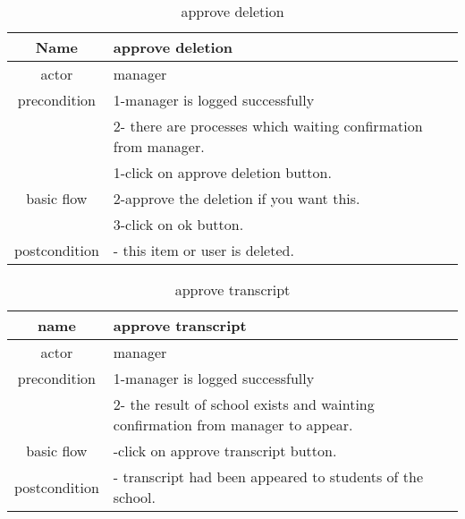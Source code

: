 \documentclass{article}
\begin{document}
     \begin{table}
     	\centering
     	\label{approve deletion}
     	\caption{approve deletion}
     	\begin{tabular}{|c|l|}
     	      \hline
     	      Name & approve deletion
     	      \\\hline
     	      actor & manager\\
     	      \hline
     	      precondition & 1-manager is logged successfully\\
     	                   & 2- there are processes which waiting confirmation from manager.\\
     	      
     	      \hline
     	                  & 1-click on approve deletion button.\\
     	      basic flow  & 2-approve the deletion if you want this.\\
     	                  & 3-click on ok button.  \\
     	      \hline
     	      
     	      postcondition & - this item or user is deleted.\\
     	      \hline
     	\end{tabular}
     \end{table}
     
     \begin{table}
     	\centering
     	\label{approve transcript}
     	\caption{approve transcript}
     	\begin{tabular}{|c|l|}
     		\hline
     		name & approve transcript\\
     		\hline
     		actor & manager\\
     		\hline
     		precondition & 1-manager is logged successfully\\
     		             &2- the result of school exists and wainting confirmation from manager to appear.\\
     		\hline
     		
     		basic flow & -click on approve transcript button.\\
     		\hline
     		
     		postcondition & - transcript had been appeared to students of the school.\\
     		\hline
     	\end{tabular}
     \end{table}
     
\end{document}
